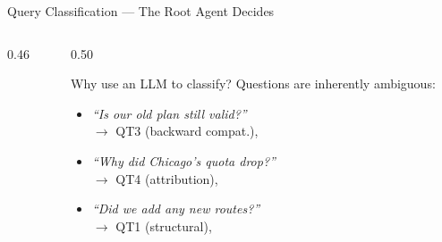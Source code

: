 \documentclass[aspectratio=169,10pt]{beamer}
\begin{document}
\begin{frame}[t]{Query Classification — The Root Agent Decides}
\begin{columns}[T]
\begin{column}{0.46\textwidth}
\begin{center}
\begin{tikzpicture}
      \end{tikzpicture}
    \end{center}
  \end{column}
  \begin{column}{0.50\textwidth}
    \vspace{4pt}
    \begin{exampleblock}{Why use an LLM to classify?}
      \small Questions are inherently ambiguous:
      \vspace{3pt}
      \begin{itemize}\setlength\itemsep{4pt}
        \item \emph{``Is our old plan still valid?''}\\
              \textcolor{aorng}{$\to$ QT3 (backward compat.),}\\
        \item \emph{``Why did Chicago's quota drop?''}\\
              \textcolor{aorng}{$\to$ QT4 (attribution),}\\
        \item \emph{``Did we add any new routes?''}\\
              \textcolor{aorng}{$\to$ QT1 (structural),}\\
      \end{itemize}
    \end{exampleblock}
    \vspace{5pt}
  \end{column}
\end{columns}
\end{frame}
\end{document}
